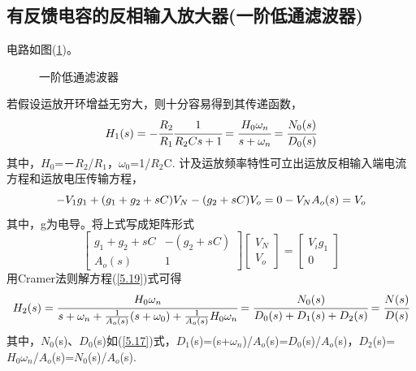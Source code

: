 \documentclass[a4paper]{article}
\begin{document}
\subsection{有反馈电容的反相输入放大器(一阶低通滤波器)}
电路如图(\ref{1orderfilter})。
\begin{figure}[!h]
\centering
{}
\caption{一阶低通滤波器}\label{1orderfilter}
\end{figure}
若假设运放开环增益无穷大，则十分容易得到其传递函数，
\begin{equation}
H_1(s) = -\cfrac{R_2}{R_1}\cfrac{1}{R_2Cs+1} = \cfrac{H_0\omega_n}{s+\omega_n} = \cfrac{N_0(s)}{D_0(s)}\label{5.17}
\end{equation}
其中，$H_0$=－$R_2$/$R_1$，$\omega_0$=1/$R_2$C.
计及运放频率特性可立出运放反相输入端电流方程和运放电压传输方程，
\begin{equation}
-V_1g_1+(g_1+g_2+sC)V_N-(g_2+sC)V_o = 0\\
-V_NA_o(s) = V_o\label{5.18}
\end{equation}
其中，g为电导。将上式写成矩阵形式
\begin{equation}
\begin{bmatrix}
g_1+g_2+sC & -(g_2+sC)\\
A_o(s) & 1
\end{bmatrix}
\begin{bmatrix}
V_N\\
V_o
\end{bmatrix}
=
\begin{bmatrix}
V_ig_1 \\
0
\end{bmatrix}
\label{5.19}
\end{equation}
用Cramer法则解方程(\ref{5.19})式可得
\begin{equation}
H_2(s) = \cfrac{H_0\omega_n}{s+\omega_n+\frac{1}{A_o(s)}(s+\omega_0)+\frac{1}{A_o(s)}H_0\omega_n}\\
= \cfrac{N_0(s)}{D_0(s)+D_1(s)+D_2(s)} = \cfrac{N(s)}{D(s)}\label{5.20}
\end{equation}
其中，$N_0$(s)、$D_0$(s)如(\ref{5.17})式，$D_1$(s)=(s+$\omega_n$)/$A_o$(s)=$D_0$(s)/$A_o$(s)，$D_2$(s)=$H_0\omega_n$/$A_o$(s)=$N_0$(s)/$A_o$(s).
\end{document}
